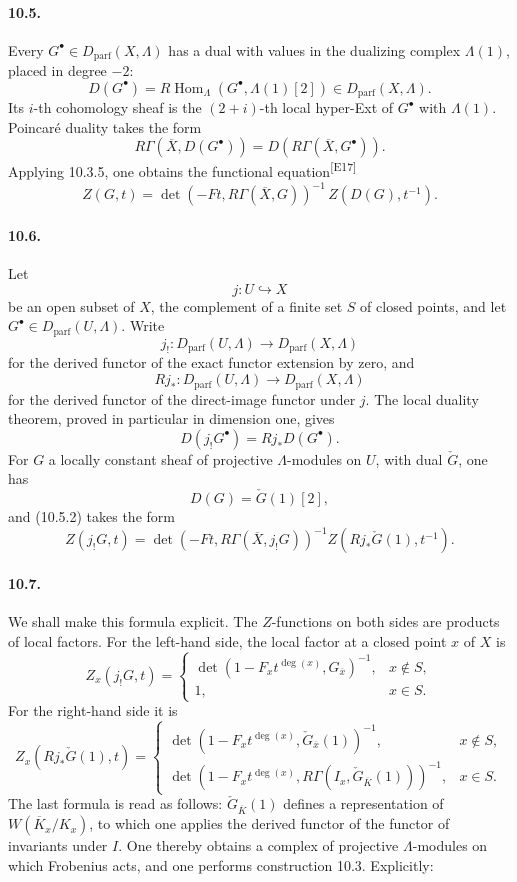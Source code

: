 \documentclass[10pt,letterpaper]{article}
\newcommand{\Hom}{\operatorname{Hom}}
\providecommand{\Hom}{\operatorname{Hom}}
\providecommand{\Hom}{\operatorname{Hom}}
\providecommand{\Dparf}{D_{\mathrm{parf}}}
\providecommand{\Hom}{\operatorname{Hom}}
\newcommand{\auditmark}[1]{\textsuperscript{\normalfont\scriptsize[E#1]}}
\begin{document}
\paragraph{10.5.} Every \(G^\bullet\in\Dparf(X,\Lambda)\) has a dual with values in the dualizing complex \(\Lambda(1)\), placed in degree \(-2\):
\[
D(G^\bullet)=R\Hom_\Lambda(G^\bullet,\Lambda(1)[2])\in\Dparf(X,\Lambda).
\]
Its \(i\)-th cohomology sheaf is the \((2+i)\)-th local hyper-Ext of \(G^\bullet\) with \(\Lambda(1)\). Poincaré duality takes the form
\[
\tag{10.5.1}
R\Gamma(\overline X,D(G^\bullet))=D(R\Gamma(\overline X,G^\bullet)).
\]
Applying 10.3.5, one obtains the functional equation\auditmark{17}
\[
\tag{10.5.2}
Z(G,t)=
\det(-Ft,R\Gamma(\overline X,G))^{-1}\,
Z(D(G),t^{-1}).
\]

\paragraph{10.6.} Let
\[
j:U\hookrightarrow X
\]
be an open subset of \(X\), the complement of a finite set \(S\) of closed points, and let \(G^\bullet\in\Dparf(U,\Lambda)\). Write
\[
j_!:\Dparf(U,\Lambda)\longrightarrow\Dparf(X,\Lambda)
\]
for the derived functor of the exact functor extension by zero, and
\[
Rj_*:\Dparf(U,\Lambda)\longrightarrow\Dparf(X,\Lambda)
\]
for the derived functor of the direct-image functor under \(j\). The local duality theorem, proved in particular in dimension one, gives
\[
\tag{10.6.1}
D(j_!G^\bullet)=Rj_*D(G^\bullet).
\]
For \(G\) a locally constant sheaf of projective \(\Lambda\)-modules on \(U\), with dual \(\check G\), one has
\[
D(G)=\check G(1)[2],
\]
and (10.5.2) takes the form
\[
\tag{10.6.2}
Z(j_!G,t)=
\det(-Ft,R\Gamma(\overline X,j_!G))^{-1}
Z(Rj_*\check G(1),t^{-1}).
\]

\paragraph{10.7.} We shall make this formula explicit. The \(Z\)-functions on both sides are products of local factors. For the left-hand side, the local factor at a closed point \(x\) of \(X\) is
\[
Z_x(j_!G,t)=
\begin{cases}
\det(1-F_x t^{\deg(x)},G_{\overline x})^{-1},&x\notin S,\\
1,&x\in S.
\end{cases}
\]
For the right-hand side it is
\[
Z_x(Rj_*\check G(1),t)=
\begin{cases}
\det(1-F_x t^{\deg(x)},\check G_{\overline x}(1))^{-1},&x\notin S,\\
\det(1-F_x t^{\deg(x)},R\Gamma(I_x,\check G_{\overline K}(1)))^{-1},&x\in S.
\end{cases}
\]
The last formula is read as follows: \(\check G_{\overline K}(1)\) defines a representation of \(W(\overline K_x/K_x)\), to which one applies the derived functor of the functor of invariants under \(I\). One thereby obtains a complex of projective \(\Lambda\)-modules on which Frobenius acts, and one performs construction 10.3. Explicitly:
\end{document}
